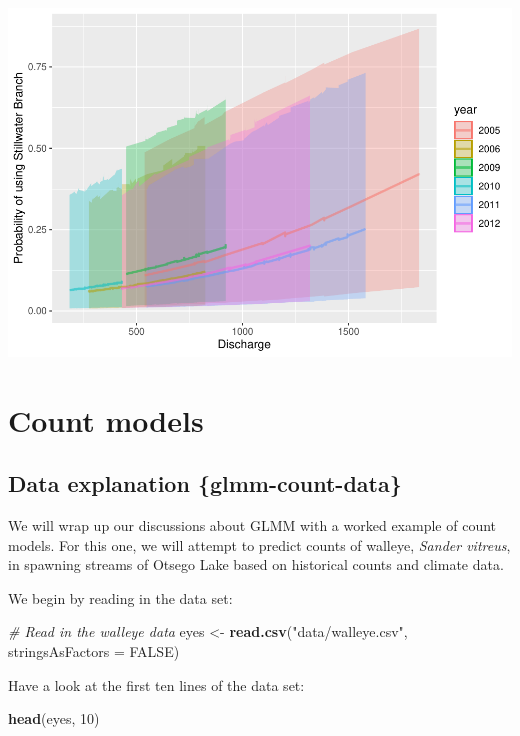 \documentclass[
]{book}
\newenvironment{Shaded}{\begin{snugshade}}{\end{snugshade}}
\newcommand{\CommentTok}[1]{\textcolor[rgb]{0.56,0.35,0.01}{\textit{#1}}}
\newcommand{\DataTypeTok}[1]{\textcolor[rgb]{0.13,0.29,0.53}{#1}}
\newcommand{\DecValTok}[1]{\textcolor[rgb]{0.00,0.00,0.81}{#1}}
\newcommand{\KeywordTok}[1]{\textcolor[rgb]{0.13,0.29,0.53}{\textbf{#1}}}
\newcommand{\NormalTok}[1]{#1}
\newcommand{\OtherTok}[1]{\textcolor[rgb]{0.56,0.35,0.01}{#1}}
\newcommand{\StringTok}[1]{\textcolor[rgb]{0.31,0.60,0.02}{#1}}
\begin{document}
\includegraphics{worstr_files/figure-latex/unnamed-chunk-394-1.pdf}

\hypertarget{glmm-count}{%
\section{Count models}\label{glmm-count}}

\hypertarget{data-explanation-glmm-count-data}{%
\subsection{Data explanation \{glmm-count-data\}}\label{data-explanation-glmm-count-data}}

We will wrap up our discussions about GLMM with a worked example of count models. For this one, we will attempt to predict counts of walleye, \emph{Sander vitreus}, in spawning streams of Otsego Lake based on historical counts and climate data.

We begin by reading in the data set:

\begin{Shaded}
\begin{Highlighting}[]
\CommentTok{# Read in the walleye data}
\NormalTok{eyes <-}\StringTok{ }\KeywordTok{read.csv}\NormalTok{(}\StringTok{"data/walleye.csv"}\NormalTok{, }\DataTypeTok{stringsAsFactors =} \OtherTok{FALSE}\NormalTok{)}
\end{Highlighting}
\end{Shaded}

Have a look at the first ten lines of the data set:

\begin{Shaded}
\begin{Highlighting}[]
\KeywordTok{head}\NormalTok{(eyes, }\DecValTok{10}\NormalTok{)}
\end{Highlighting}
\end{Shaded}
\end{document}
